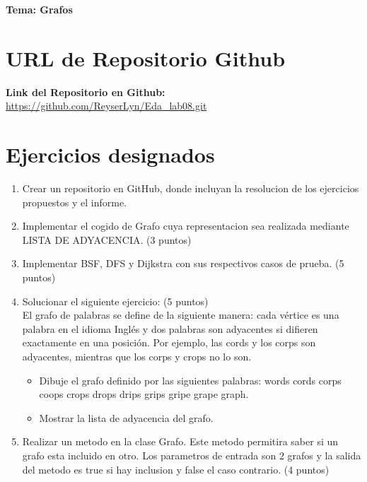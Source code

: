 \documentclass{article}
\newcommand{\itemTheme}{Grafos}
\begin{document}
        \centerline{\textbf{\Large Tema: \itemTheme}}

        \section{URL de Repositorio Github}
            \textbf{Link del Repositorio en Github: }    
                \url{https://github.com/ReyserLyn/Eda_lab08.git}

        
        \section{Ejercicios designados}

        \begin{enumerate}
            \item Crear un repositorio en GitHub, donde incluyan la resolucion de los ejercicios propuestos y el informe. 
            \item Implementar el cogido de Grafo cuya representacion sea realizada mediante LISTA DE ADYACENCIA. (3 puntos) 
            \item Implementar BSF, DFS y Dijkstra con sus respectivos casos de prueba. (5 puntos)
            \item Solucionar el siguiente ejercicio: (5 puntos) \\
            El grafo de palabras se define de la siguiente manera: cada vértice es una palabra en el idioma Inglés y dos palabras son adyacentes si difieren exactamente en una posición. Por ejemplo, las cords y los corps son adyacentes, mientras que los corps y crops no lo son. 
            
            {\begin{itemize}
                \item Dibuje el grafo definido por las siguientes palabras: words cords corps coops crops drops drips grips gripe grape graph.
                \item Mostrar la lista de adyacencia del grafo.
            \end{itemize}}

            \item Realizar un metodo en la clase Grafo. Este metodo permitira saber si un grafo esta incluido en otro. Los parametros de entrada son 2 grafos y la salida del metodo es true si hay inclusion y false el caso contrario. (4 puntos)
        \end{enumerate} 
\end{document}
